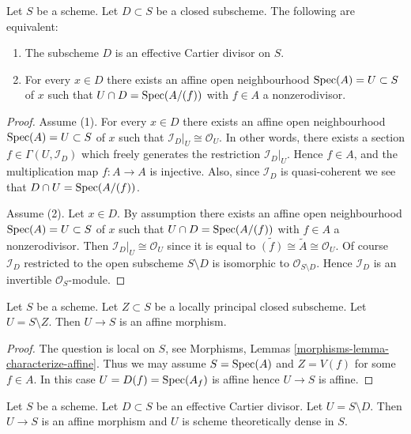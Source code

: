 \begin{lemma}
\label{lemma-characterize-effective-Cartier-divisor}
Let $S$ be a scheme.
Let $D \subset S$ be a closed subscheme.
The following are equivalent:
\begin{enumerate}
\item The subscheme $D$ is an effective Cartier divisor on $S$.
\item For every $x \in D$ there exists an affine open neighbourhood
$\mathop{\mathrm{Spec}}(A) = U \subset S$ of $x$ such that
$U \cap D = \mathop{\mathrm{Spec}}(A/(f))$ with $f \in A$ a nonzerodivisor.
\end{enumerate}
\end{lemma}

\begin{proof}
Assume (1).  For every $x \in D$ there exists an affine open neighbourhood
$\mathop{\mathrm{Spec}}(A) = U \subset S$ of $x$ such that
$\mathcal{I}_D|_U \cong \mathcal{O}_U$. In other words, there exists
a section $f \in \Gamma(U, \mathcal{I}_D)$ which freely generates the
restriction $\mathcal{I}_D|_U$. Hence $f \in A$, and the multiplication
map $f : A \to A$ is injective. Also, since $\mathcal{I}_D$ is
quasi-coherent we see that $D \cap U = \mathop{\mathrm{Spec}}(A/(f))$.

\medskip\noindent
Assume (2). Let $x \in D$. By assumption there exists an affine open
neighbourhood $\mathop{\mathrm{Spec}}(A) = U \subset S$ of $x$ such that
$U \cap D = \mathop{\mathrm{Spec}}(A/(f))$ with $f \in A$ a nonzerodivisor.
Then $\mathcal{I}_D|_U \cong \mathcal{O}_U$ since it is equal to
$\widetilde{(f)} \cong \widetilde{A} \cong \mathcal{O}_U$.
Of course $\mathcal{I}_D$ restricted to the open subscheme
$S \setminus D$ is isomorphic to $\mathcal{O}_{S \setminus D}$.
Hence $\mathcal{I}_D$ is an invertible $\mathcal{O}_S$-module.
\end{proof}

\begin{lemma}
\label{lemma-complement-locally-principal-closed-subscheme}
Let $S$ be a scheme. Let $Z \subset S$ be a locally principal closed
subscheme. Let $U = S \setminus Z$. Then $U \to S$ is an affine morphism.
\end{lemma}

\begin{proof}
The question is local on $S$, see
Morphisms, Lemmas \ref{morphisms-lemma-characterize-affine}.
Thus we may assume $S = \mathop{\mathrm{Spec}}(A)$ and $Z = V(f)$ for some $f \in A$.
In this case $U = D(f) = \mathop{\mathrm{Spec}}(A_f)$ is affine hence $U \to S$ is affine.
\end{proof}

\begin{lemma}
\label{lemma-complement-effective-Cartier-divisor}
Let $S$ be a scheme. Let $D \subset S$ be an effective Cartier divisor.
Let $U = S \setminus D$. Then $U \to S$ is an affine morphism and $U$
is scheme theoretically dense in $S$.
\end{lemma}

